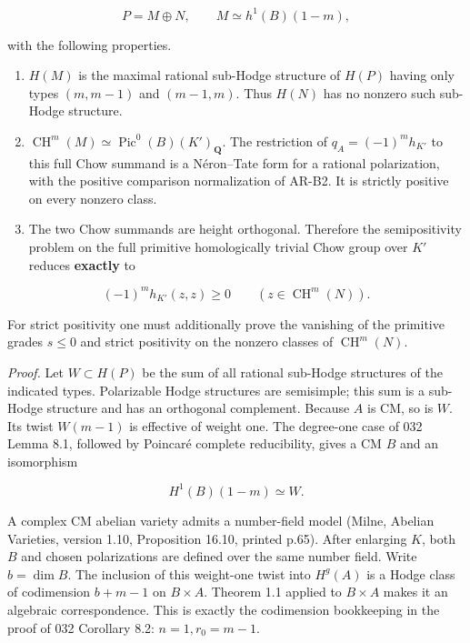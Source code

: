 \documentclass[11pt,a4paper]{article}
\providecommand{\tightlist}{\setlength{\itemsep}{0pt}\setlength{\parskip}{0pt}}
\begin{document}
\[
P=M\oplus N,\qquad M\simeq h^1(B)(1-m),
\tag{AR.4}
\]

with the following properties.

\begin{enumerate}
\def\labelenumi{\arabic{enumi}.}
\tightlist
\item
  \(H(M)\) is the maximal rational sub-Hodge structure of \(H(P)\)
  having only types \((m,m-1)\) and \((m-1,m)\). Thus \(H(N)\) has no
  nonzero such sub-Hodge structure.
\item
  \(\operatorname{CH}^m(M)\simeq\operatorname{Pic}^0(B)(K')_{\mathbf Q}\).
  The restriction of \(q_A=(-1)^m h_{K'}\) to this full Chow summand is
  a Néron--Tate form for a rational polarization, with the positive
  comparison normalization of AR-B2. It is strictly positive on every
  nonzero class.
\item
  The two Chow summands are height orthogonal. Therefore the
  semipositivity problem on the full primitive homologically trivial
  Chow group over \(K'\) reduces \textbf{exactly} to
\end{enumerate}

\[
(-1)^m h_{K'}(z,z)\ge0
\qquad(z\in\operatorname{CH}^m(N)).
\tag{AR-GATE}
\]

For strict positivity one must additionally prove the vanishing of the
primitive grades \(s\le0\) and strict positivity on the nonzero classes
of \(\operatorname{CH}^m(N)\).

\emph{Proof.} Let \(W\subset H(P)\) be the sum of all rational sub-Hodge
structures of the indicated types. Polarizable Hodge structures are
semisimple; this sum is a sub-Hodge structure and has an orthogonal
complement. Because \(A\) is CM, so is \(W\). Its twist \(W(m-1)\) is
effective of weight one. The degree-one case of 032 Lemma 8.1, followed
by Poincaré complete reducibility, gives a CM \(B\) and an isomorphism

\[
H^1(B)(1-m)\simeq W.
\]

A complex CM abelian variety admits a number-field model (Milne, Abelian
Varieties, version 1.10, Proposition 16.10, printed p.65). After
enlarging \(K\), both \(B\) and chosen polarizations are defined over
the same number field. Write \(b=\dim B\). The inclusion of this
weight-one twist into \(H^g(A)\) is a Hodge class of codimension
\(b+m-1\) on \(B\times A\). Theorem 1.1 applied to \(B\times A\) makes
it an algebraic correspondence. This is exactly the codimension
bookkeeping in the proof of 032 Corollary 8.2: \(n=1,r_0=m-1\).
\end{document}
